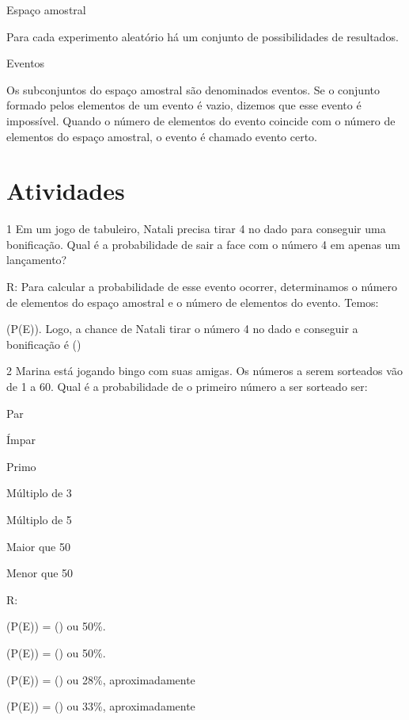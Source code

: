 {Espaço amostral

Para cada experimento aleatório há um conjunto de possibilidades de
resultados.

Eventos

Os subconjuntos do espaço amostral são denominados eventos. Se o
conjunto formado pelos elementos de um evento é vazio, dizemos que esse
evento é impossível. Quando o número de elementos do evento coincide com
o número de elementos do espaço amostral, o evento é chamado evento
certo.

\section{Atividades}

\num{1} Em um jogo de tabuleiro, Natali precisa tirar 4 no dado para
conseguir uma bonificação. Qual é a probabilidade de sair a face com o
número 4 em apenas um lançamento?

R: Para calcular a probabilidade de esse evento ocorrer, determinamos o
número de elementos do espaço amostral e o número de elementos do
evento. Temos:

(P(E)). Logo, a chance de Natali tirar o número 4 no
dado e conseguir a bonificação é ()

\num{2} Marina está jogando bingo com suas amigas. Os números a serem
sorteados vão de 1 a 60. Qual é a probabilidade de o primeiro número a
ser sorteado ser:
\item Par
\item Ímpar
\item Primo
\item Múltiplo de 3
\item Múltiplo de 5
\item Maior que 50
\item Menor que 50

R:
\item

(P(E)) = () ou 50\%.
\item

(P(E)) = () ou 50\%.
\item

(P(E)) = () ou 28\%, aproximadamente
\item

(P(E)) = () ou 33\%, aproximadamente
\item

}
